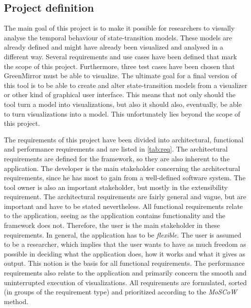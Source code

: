 \subsection{Project definition}\label{sec:intro;sub:project}%
The main goal of this project is to make it possible for researchers to visually analyse the temporal behaviour of state-transition models. These models are already defined and might have already been visualized and analysed in a different way. Several requirements and use cases have been defined that mark the scope of this project. Furthermore, three test cases have been chosen that GreenMirror must be able to visualize. The ultimate goal for a final version of this tool is to be able to create and alter state-transition models from a visualizer or other kind of graphical user interface. This means that not only should the tool turn a model into visualizations, but also it should also, eventually, be able to turn visualizations into a model. This unfortunately lies beyond the scope of this project.
\par The requirements of this project have been divided into architectural, functional and performance requirements and are listed in \cref{tab:req}. The architectural requirements are defined for the framework, so they are also inherent to the application. The developer is the main stakeholder concerning the architectural requirements, since he has most to gain from a well-defined software system. The tool owner is also an important stakeholder, but mostly in the extensibility requirement. The architectural requirements are fairly general and vague, but are important and have to be stated nevertheless. All functional requirements relate to the application, seeing as the application contains functionality and the framework does not. Therefore, the user is the main stakeholder in these requirements. In general, the application has to be \emph{flexible}. The user is assumed to be a researcher, which implies that the user wants to have as much freedom as possible in deciding what the application does, how it works and what it gives as output. This notion is the basis for all functional requirements. The performance requirements also relate to the application and primarily concern the smooth and uninterrupted execution of visualizations. All requirements are formulated, sorted (in groups of the requirement type) and prioritized according to the \emph{MoSCoW} method.
